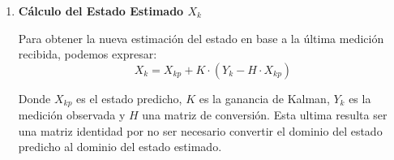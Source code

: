 \begin{enumerate}
\begin{equation}
    R =
    \begin{bmatrix}
        {\Delta_x}^2 & \Delta_x \cdot \Delta_{v_x} \\
        \Delta_x \cdot \Delta_{v_x} & {\Delta_{v_x}}^2 \\
    \end{bmatrix} \\ 
    =
    \begin{bmatrix}
        {\Delta_x}^2 & 0 \\
        0 & {\Delta_{v_x}}^2 \\
    \end{bmatrix} \\ 
\end{equation}

\newpage
Por lo que para calcular la ganancia de Kalman tenemos:

\begin{equation}
    K =
    \frac{
        \begin{bmatrix}
        {\Delta_{px}}^2 & 0 \\
        0 & {\Delta_{pv_x}}^2 \\
        \end{bmatrix}
    }
    {
        \begin{bmatrix}
        {\Delta_{px}}^2 & 0 \\
        0 & {\Delta_{pv_x}}^2 \\
        \end{bmatrix}
        +
        \begin{bmatrix}
        {\Delta_x}^2 & 0 \\
        0 & {\Delta_{v_x}}^2 \\
        \end{bmatrix} \\ 
    }    
\end{equation}

\item \textbf{Cálculo del Estado Estimado $X_k$} \mbox{} \vspace{4pt}

Para obtener la nueva estimación del estado en base a la última medición recibida, podemos expresar:
\begin{equation}
    X_k = X_{kp} + K \cdot ( Y_k - H \cdot X_{kp} )  
\end{equation}

Donde $X_{kp}$ es el estado predicho, $K$ es la ganancia de Kalman, $Y_k$ es la medición observada y $H$ una matriz de conversión. Esta ultima resulta ser una matriz identidad por no ser necesario convertir el dominio del estado predicho al dominio del estado estimado.


\end{enumerate}
